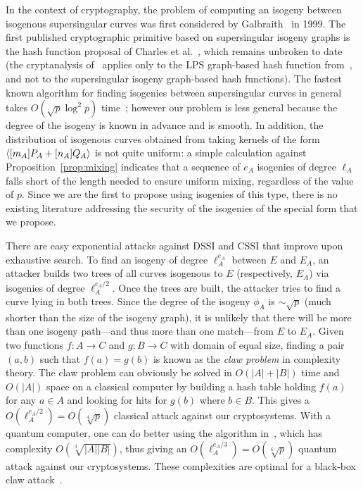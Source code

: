 In the context of cryptography, the problem of computing an isogeny
between isogenous supersingular curves was first considered by
Galbraith~\cite{Gal} in 1999. The first published cryptographic
primitive based on supersingular isogeny graphs is the hash function
proposal of Charles et al.~\cite{charles+lauter+goren09}, which remains unbroken to date
(the cryptanalysis of~\cite{quis} applies only to the LPS graph-based
hash function from~\cite{charles+lauter+goren09}, and not to the supersingular isogeny
graph-based hash functions). The fastest known algorithm for finding
isogenies between supersingular curves in general takes $O(\sqrt{p}
\log^2 p)$ time~\cite[\S 5.3.1]{charles+lauter+goren09}; however our problem is less
general because the degree of the isogeny is known in advance and is
smooth. In addition, the distribution of isogenous
  curves obtained
from taking kernels of the form ${\langle [m_A]P_A+[n_A]Q_A \rangle}$ is not quite
uniform: a simple calculation against Proposition~\ref{prop:mixing}
indicates that a sequence of $e_A$ isogenies of degree $\ell_A$ falls
short of the length needed to ensure uniform mixing, regardless of the
value of $p$. Since we are the first to propose using isogenies of
this type, there is no existing literature addressing the security
of the isogenies of the special form that we propose.

There are easy exponential attacks against DSSI and CSSI that improve
upon exhaustive search. To find an isogeny of degree $\ell_A^{e_A}$
between $E$ and $E_A$, an attacker builds two trees of all curves
isogenous to $E$ (respectively, $E_A$) via isogenies of degree
$\ell_A^{e_A/2}$. Once the trees are built, the attacker tries to find
a curve lying in both trees. Since the degree of the isogeny $\phi_A$
is $\sim\sqrt{p}$ (much shorter than the size of the isogeny graph),
it is unlikely that there will be more than one isogeny path---and
thus more than one match---from $E$ to $E_A$. Given two functions
$f:A\to C$ and $g:B\to C$ with domain of equal size, finding a pair
$(a,b)$ such that $f(a)=g(b)$ is known as the \emph{claw problem} in
complexity theory. The claw problem can obviously be solved in $O(|A|
+ |B|)$ time and $O(|A|)$ space on a classical computer by building a
hash table holding $f(a)$ for any $a\in A$ and looking for hits for
$g(b)$ where $b\in B$. This gives a $O(\ell_A^{e_A/2})=O(\sqrt[4]{p})$
classical attack against our cryptosystems. With a quantum computer,
one can do better using the algorithm in~\cite{tani2009claw}, which has
complexity $O(\sqrt[3]{|A||B|})$, thus giving an
$O(\ell_A^{e_A/3})=O(\sqrt[6]{p})$ quantum attack against our
cryptosystems. These complexities are optimal for a black-box claw
attack~\cite{zhang}.

